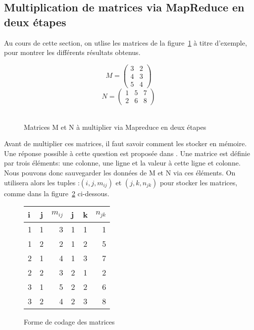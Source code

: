 \subsection{Multiplication de matrices via MapReduce en deux étapes}

Au cours de cette section, on utlise les matrices de la figure~\ref{Matrices M et N} à titre d'exemple, pour montrer les différents résultats obtenus.
\begin{figure}[h]
  \begin{center}
    $$M = \begin{pmatrix} 3 & 2 \\ 4 & 3 \\ 5 & 4 \end{pmatrix}$$
    $$N = \begin{pmatrix}  1 & 5 & 7 \\ 2 & 6 & 8 \end{pmatrix}$$ \\
  \end{center}
  \caption{Matrices M et N à multiplier via Mapreduce en deux étapes}
  \label{Matrices M et N}
\end{figure}

Avant de multiplier ces matrices, il faut savoir comment les stocker en mémoire. Une réponse possible à cette question est proposée dans \cite{Ullman}.
Une matrice est définie par trois éléments: une colonne, une ligne et la valeur à cette ligne et colonne.
Nous pouvons donc sauvegarder les données de M et N via ces éléments. On utilisera alors les tuples :$(i,j,m_{ij})$ et $(j,k,n_{jk})$ pour stocker les matrices, comme 
dans la figure~\ref{ codage M et N } ci-dessous.

\begin{figure}[H]
  \begin{center}
    \begin{tabular}{|l|c|r||l|c|r|} \hline
      i & j & $m_{ij}$ & j & k & $n_{jk}$\\
      \hline
      1 &  1 & 3 & 1 & 1 & 1\\
      \hline
      1 & 2 &  2 & 1 & 2 & 5\\
      \hline
      2 & 1 & 4 & 1 & 3 & 7\\
      \hline
      2 & 2 & 3 & 2 & 1 & 2\\
      \hline
      3 & 1 & 5 & 2 & 2 & 6\\
      \hline
      3 & 2 & 4 & 2 & 3 & 8\\
      \hline
    \end{tabular}
  \end{center} 
  \caption{Forme de codage des matrices}
  \label{ codage M et N }
\end{figure}

